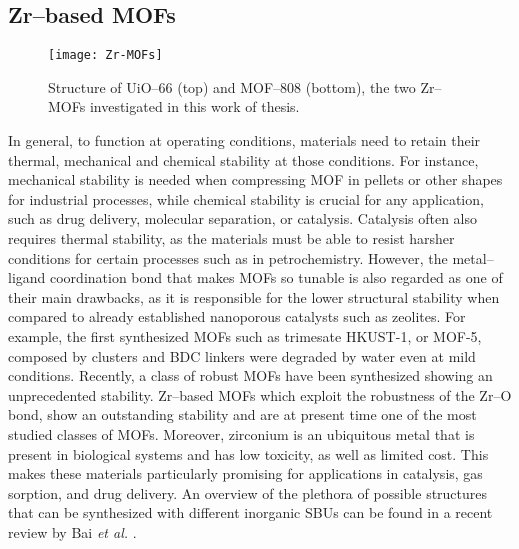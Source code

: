 \subsection*{Zr--based MOFs}
\begin{figure}[!htbp]
	\centering
 	\texttt{[image: Zr-MOFs]}
	\caption{Structure of UiO--66 (top) and MOF--808 (bottom), the two Zr--MOFs investigated in this work of thesis.}
	\label{fig:Zr-MOFs}
\end{figure}
In general, to function at operating conditions, materials need to retain their thermal, mechanical and chemical stability at those conditions. For instance, mechanical stability is needed when compressing MOF in pellets or other shapes for industrial processes\cite{chapman2009pressure}, while chemical stability is crucial for any application, such as drug delivery, molecular separation, or catalysis\cite{horcajada2010porous}. Catalysis often also requires thermal stability, as the materials must be able to resist harsher conditions for certain processes such as in petrochemistry. 
However, the metal--ligand coordination bond that makes MOFs so tunable is also regarded as one of their main drawbacks\cite{keskin2010can, canivet2014water, kizzie2011effect}, as it is responsible for the lower structural stability when compared to already established nanoporous catalysts such as zeolites. For example, the first synthesized MOFs such as  trimesate HKUST-1, or MOF-5, composed by  clusters and BDC linkers were degraded by water even at mild conditions\cite{greathouse2006interaction, low2009virtual, kaye2007impact, decoste2013effect}. 
\npar
Recently, a class of robust MOFs have been synthesized showing an unprecedented stability\cite{furukawa2014water}. Zr--based MOFs\cite{bai2016zr} which exploit the robustness of the Zr--O bond, show an outstanding stability and are at present time one of the most studied classes of MOFs. Moreover, zirconium is an ubiquitous metal that is present in biological systems and has low toxicity, as well as limited cost. This makes these materials particularly promising for applications in catalysis, gas sorption, and drug delivery. An overview of the plethora of possible structures that can be synthesized with different inorganic SBUs can be found in a recent review by Bai \textit{et al.} \cite{bai2016zr}.
\npar
